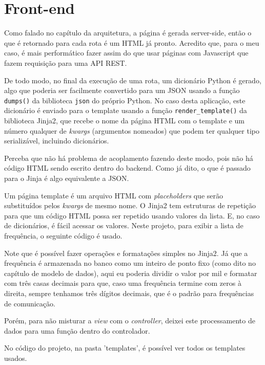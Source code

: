 \chapter{Front-end}

Como falado no capítulo da arquitetura, a página é gerada server-side, então o que 
é retornado para cada rota é um HTML já pronto. Acredito que, para o meu caso, é mais 
performático fazer assim do que usar páginas com Javascript que fazem requisição para uma API REST.

De todo modo, no final da execução de uma rota, um dicionário Python é gerado, algo que 
poderia ser facilmente convertido para um JSON usando a função \texttt{dumps()} da 
biblioteca \texttt{json} do próprio Python. No caso desta aplicação, este dicionário é 
enviado para o template usando a função \texttt{render\_template()} da biblioteca Jinja2, 
que recebe o nome da página HTML com o template e um número qualquer de \textit{kwargs} (argumentos nomeados) 
que podem ter qualquer tipo serializável, incluindo dicionários.

Perceba que não há problema de acoplamento fazendo deste modo, pois não há código HTML sendo 
escrito dentro do backend. Como já dito, o que é passado para o Jinja é algo equivalente a JSON.

Um página template é um arquivo HTML com \textit{placeholders} que serão substituídos pelos 
\textit{kwargs} de mesmo nome. O Jinja2 tem estruturas de repetição para que um código HTML 
possa ser repetido usando valores da lista. E, no caso de dicionários, é fácil acessar 
os valores. Neste projeto, para exibir a lista de frequência, o seguinte código é usado.



Note que é possível fazer operações e formatações simples no Jinja2. Já que a frequência 
é armazenada no banco como um inteiro de ponto fixo (como dito no capítulo de modelo de dados), 
aqui eu poderia dividir o valor por mil e formatar com três casas decimais para que, caso 
uma frequência termine com zeros à direita, sempre tenhamos três dígitos decimais, que 
é o padrão para frequências de comunicação.

Porém, para não misturar a \textit{view} com o \textit{controller}, deixei este processamento 
de dados para uma função dentro do controlador.



No código do projeto, na pasta 'templates', é possível ver todos os templates usados.
